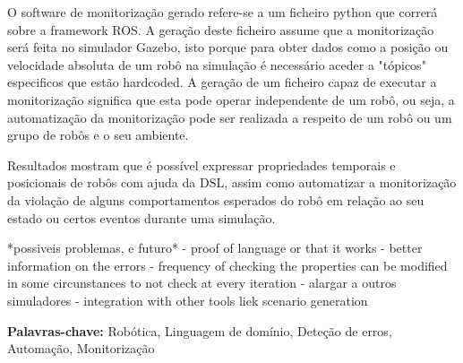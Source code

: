 O software de monitorização gerado refere-se a um ficheiro python que correrá sobre a framework ROS. A geração deste ficheiro assume que a monitorização será feita no simulador Gazebo, isto porque para obter dados como a posição ou velocidade absoluta de um robô na simulação é necessário aceder a "tópicos" especificos que estão hardcoded. A geração de um ficheiro capaz de executar a monitorização significa que esta pode operar independente de um robô, ou seja, a automatização da monitorização pode ser realizada a respeito de um robô ou um grupo de robôs e o seu ambiente.

Resultados mostram que é possível expressar propriedades temporais e posicionais de robôs com ajuda da DSL, assim como automatizar a monitorização da violação de alguns comportamentos esperados do robô em relação ao seu estado ou certos eventos durante uma simulação.


*possiveis problemas, e futuro* - proof of language or that it works - better information on the errors - frequency of checking the properties can be modified in some circunstances to not check at every iteration - alargar a outros simuladores - integration with other tools liek scenario generation


\vfill

\begin{flushleft}
\textbf{Palavras-chave:}
Robótica, Linguagem de domínio, Deteção de erros, Automação, Monitorização
\end{flushleft}

